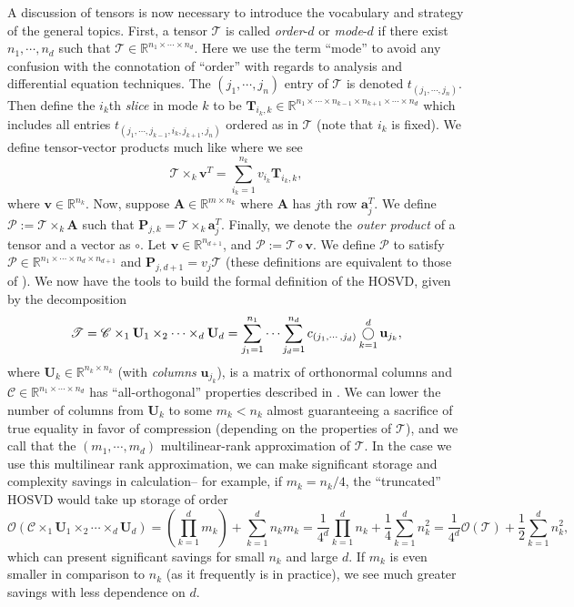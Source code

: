 \documentclass[12pt]{article}
\newcommand{\R}{\mathbb{R}}
\newcommand{\outerprod}{\operatornamewithlimits{\bigcirc}}
\begin{document}
    A discussion of tensors is now necessary to introduce the vocabulary and strategy of the general topics. First, a tensor $\mathscr{T}$ is called \textit{order}-$d$ or \textit{mode}-$d$ if there exist $n_1,\cdots,n_d$ such that $\mathscr{T}\in \R^{n_1\times\cdots\times n_d}$. Here we use the term ``mode'' to avoid any confusion with the connotation of ``order'' with regards to analysis and differential equation techniques. The $(j_1,\cdots,j_n)$ entry of $\mathscr{T}$ is denoted $t_{(j_1,\cdots,j_n)}$. Then define the $i_k$th \textit{slice} in mode $k$ to be $\mathbf{T}_{i_k,k}\in\R^{n_1\times\cdots\times n_{k-1}\times n_{k+1}\times\cdots\times n_d}$ which includes all entries $t_{(j_1,\cdots,j_{k-1},i_k,j_{k+1},j_n)}$ ordered as in $\mathscr{T}$ (note that $i_k$ is fixed). We define tensor-vector products much like \cite{kolda_bader} where we see
        \[\mathscr{T}\times_k \mathbf{v}^T = \sum_{i_k=1}^{n_k}v_{i_k}\mathbf{T}_{i_k,k},\]
    where $\mathbf{v}\in\mathbb{R}^{n_k}$. Now, suppose $\mathbf{A}\in\R^{m\times n_k}$ where $\mathbf{A}$ has $j$th row $\mathbf{a}_j^T$. We define $\mathcal{P} := \mathscr{T}\times_k\mathbf{A}$ such that $\mathbf{P}_{j,k} = \mathscr{T}\times_k \mathbf{a}_j^T$. Finally, we denote the \textit{outer product} of a tensor and a vector as $\circ$. Let $\mathbf{v}\in\R^{n_{d+1}}$, and $\mathscr{P} := \mathscr{T}\circ\mathbf{v}$. We define $\mathscr{P}$ to satisfy $\mathscr{P}\in\R^{n_1\times\cdots\times n_d\times n_{d+1}}$ and $\mathbf{P}_{j,d+1} = v_j\mathscr{T}$ (these definitions are equivalent to those of \cite{hosvd, kolda_bader}). We now have the tools to build the formal definition of the HOSVD, given by the decomposition
    \begin{equation}\label{eqn:def_hosvd}
        \mathscr{T} = \mathscr{C}\times_1\mathbf{U}_1\times_2\cdots\times_d\mathbf{U}_d = \sum_{j_1=1}^{n_1}\cdots\sum_{j_d=1}^{n_d}c_{(j_1,\cdots,j_d)}\outerprod_{k=1}^d \mathbf{u}_{j_k},
    \end{equation}
    where $\mathbf{U}_k\in\R^{n_k\times n_k}$ (with \textit{columns} $\mathbf{u}_{j_k}$), is a matrix of orthonormal columns and $\mathscr{C}\in\R^{n_1\times\cdots\times n_d}$ has ``all-orthogonal'' properties described in \cite{hosvd}. We can lower the number of columns from $\mathbf{U}_k$ to some $m_k<n_k$ almost guaranteeing a sacrifice of true equality in favor of compression (depending on the properties of $\mathscr{T}$), and we call that the $(m_1,\cdots,m_d)$ multilinear-rank approximation of $\mathscr{T}$. In the case we use this multilinear rank approximation, we can make significant storage and complexity savings in calculation-- for example, if $m_k = n_k/4$, the ``truncated'' HOSVD would take up storage of order
        \[\mathcal{O}(\mathscr{C}\times_1\mathbf{U}_1\times_2\cdots\times_d\mathbf{U}_d)=\left(\prod_{k=1}^d m_k\right)+ \sum_{k=1}^dn_km_k = \frac{1}{4^d}\prod_{k=1}^d n_k+\frac{1}{4}\sum_{k=1}^d n_k^2 = \frac{1}{4^d}\mathcal{O}(\mathscr{T})+\frac{1}{2}\sum_{k=1}^d n_k^2,\]
    which can present significant savings for small $n_k$ and large $d$. If $m_k$ is even smaller in comparison to $n_k$ (as it frequently is in practice), we see much greater savings with less dependence on $d$.
\end{document}
